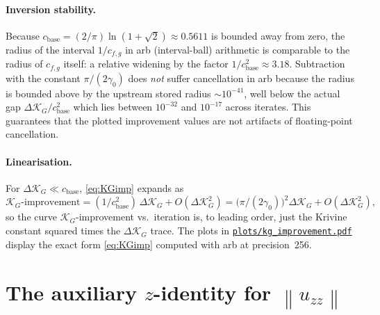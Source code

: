 \documentclass[11pt]{article}
\theoremstyle{definition}
\newcommand{\KG}{\mathcal{K}_G}
\newcommand{\norm}[1]{\left\lVert#1\right\rVert}
\begin{document}
\paragraph{Inversion stability.}
Because $c_{\text{base}}=(2/\pi)\ln(1+\sqrt 2) \approx 0.5611$ is bounded away from zero,
the radius of the interval $1/c_{f,g}$ in arb (interval-ball) arithmetic is comparable to
the radius of $c_{f,g}$ itself: a relative widening by the factor
$1/c_{\text{base}}^2\approx 3.18$. Subtraction with the constant $\pi/(2\gamma_0)$ does
\emph{not} suffer cancellation in arb because the radius is bounded above by the
upstream stored radius $\sim 10^{-41}$, well below the actual gap $\Delta\KG/c_{\text{base}}^2$
which lies between $10^{-32}$ and $10^{-17}$ across iterates. This guarantees that the
plotted improvement values are not artifacts of floating-point cancellation.

\paragraph{Linearisation.}
For $\Delta\KG\ll c_{\text{base}}$,
\eqref{eq:KGimp} expands as
\(
   \KG\text{-improvement}
   = (1/c_{\text{base}}^2)\,\Delta\KG + O(\Delta\KG^2)
   = \bigl(\pi/(2\gamma_0)\bigr)^2 \Delta\KG + O(\Delta\KG^2),
\)
so the curve $\KG$-improvement vs.\ iteration is, to leading order, just the Krivine
constant squared times the $\Delta\KG$ trace. The plots in
\href{run:plots/kg_improvement.pdf}{\texttt{plots/kg\_improvement.pdf}} display the
exact form \eqref{eq:KGimp} computed with arb at precision~256.

\bigskip

\section{The auxiliary $z$-identity for $\norm{u_{zz}}$}\label{sec:aux-z-identity}
\end{document}
